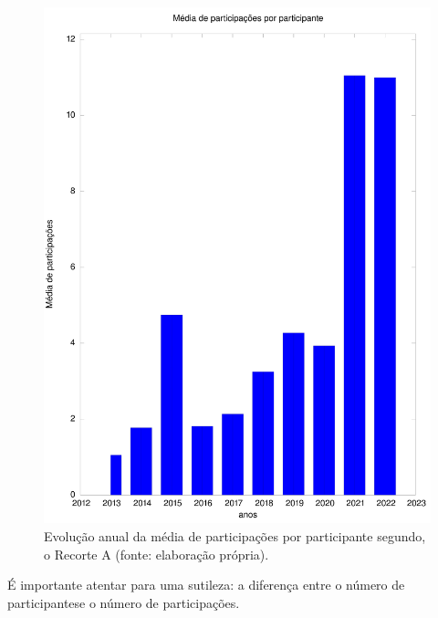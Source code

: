 \documentclass[
12pt,		%
openright,	%
twoside,  %
a4paper,			%
chapter=TITLE,		%
english,			%
french,				%
spanish,			%
brazil				%
]{USPSC-classe/USPSC}
\begin{document}
\begin{figure}[max size={\textwidth}{\textheight}]
\begin{minipage}[b]{0.4\linewidth}
                \includegraphics[width=1.0\linewidth]{../../imagens/output-media-participacoes.jpeg}
                \caption{Evolu\c{c}\~ao anual da m\'edia de participa\c{c}\~oes por participante segundo, o Recorte A (fonte: elabora\c{c}\~ao pr\'opria).}
                \label{a8f2d72073b88290f9b8731b144383d2f7c4dc4b}
\end{minipage}%
\hspace{0.5cm}
\end{figure}



\'E importante atentar para uma sutileza: a diferen\c{c}a entre o \textquotedbl  n\'umero de participantes\textquotedbl  e o \textquotedbl n\'umero de participa\c{c}\~oes\textquotedbl .
\end{document}
